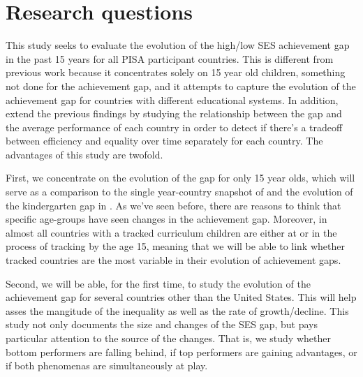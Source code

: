 \documentclass[11pt, a4paper]{article}\usepackage[]{graphicx}\usepackage[]{color}
\begin{document}

\section{Research questions}

This study seeks to evaluate the evolution of the high/low SES achievement gap in the past 15 years for all PISA participant countries. This is different from previous work because it concentrates solely on 15 year old children, something not done for the achievement gap, and it attempts to capture the evolution of the achievement gap for countries with different educational systems. In addition, extend the previous findings by studying the relationship between the gap and the average performance of each country in order to detect if there's a tradeoff between efficiency and equality over time separately for each country. The advantages of this study are twofold.

First, we concentrate on the evolution of the gap for only 15 year olds, which will serve as a comparison to the single year-country snapshot of \citet{anna2016} and the evolution of the kindergarten gap in \citet{reardon_portilla}. As we've seen before, there are reasons to think that specific age-groups have seen changes in the achievement gap. Moreover, in almost all countries with a tracked curriculum children are either at or in the process of tracking by the age 15, meaning that we will be able to link whether tracked countries are the most variable in their evolution of achievement gaps.

Second, we will be able, for the first time, to study the evolution of the achievement gap for several countries other than the United States. This will help asses the mangitude of the inequality as well as the rate of growth/decline. This study not only documents the size and changes of the SES gap, but pays particular attention to the source of the changes. That is, we study whether bottom performers are falling behind, if top performers are gaining advantages, or if both phenomenas are simultaneously at play.
\end{document}
